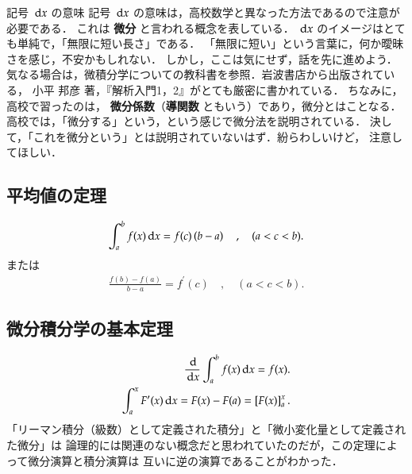                 \begin{memo}{記号 $\,\mathrm{d} x$ の意味}
                    記号 $\,\mathrm{d} x$ の意味は，高校数学と異なった方法であるので注意が必要である．
                    これは \textbf{微分} と言われる概念を表している．
                    $\,\mathrm{d} x$ のイメージはとても単純で，「無限に短い長さ」である．
                    「無限に短い」という言葉に，何か曖昧さを感じ，不安かもしれない．
                    しかし，ここは気にせず，話を先に進めよう．
                    気なる場合は，微積分学についての教科書を参照．岩波書店から出版されている，
                    小平 邦彦 著，『解析入門1，2』がとても厳密に書かれている．
                    ちなみに，高校で習ったのは，
                    \textbf{微分係数}（\textbf{導関数} ともいう）であり，微分とはことなる．
                    高校では，「微分する」という，という感じで微分法を説明されている．
                    決して，「これを微分という」とは説明されていないはず．紛らわしいけど，
                    注意してほしい．
                \end{memo}

            \subsection{平均値の定理}
            \begin{align}
                \int_{a}^{b} f(x) \,\mathrm{d} x = f(c)\left(b-a\right)
                \quad, \quad (a<c<b).
            \end{align}
            または
            \begin{align}
                \frac{f(b)-f(a)}{b-a} = f^{\prime}(c)
                \quad, \quad (a<c<b).
            \end{align}

        \subsection{微分積分学の基本定理}
        \begin{align}
            \frac{\,\mathrm{d}}{\,\mathrm{d} x} \int_{a}^{b} f(x) \,\mathrm{d} x = f(x). \\
            \int_{a}^{x} F^{\prime}(x) \,\mathrm{d} x = F(x) - F(a) = \left[ F(x) \right]_{a}^{x}.
        \end{align}
        「リーマン積分（級数）として定義された積分」と「微小変化量として定義された微分」は
        論理的には関連のない概念だと思われていたのだが，この定理によって微分演算と積分演算は
        互いに逆の演算であることがわかった．
        
